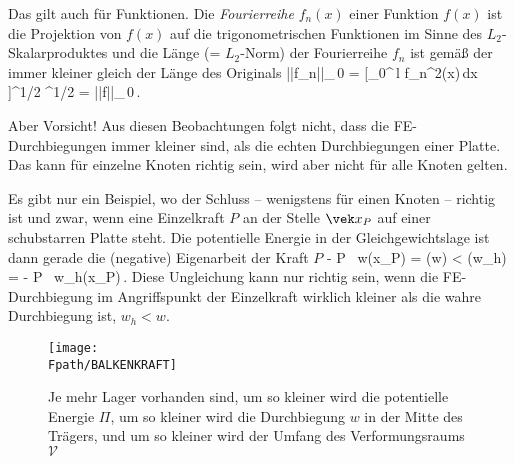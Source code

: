 Das gilt auch f\"{u}r Funktionen. Die {\em Fourierreihe\/} $f_n(x)$ einer Funktion $f(x)$ ist die Projektion
von $f(x)$ auf die trigonometrischen Funktionen im Sinne des $L_2$-Skalarproduktes und
die L\"{a}nge (= $L_2$-Norm) der Fourierreihe $f_n$ ist gem\"{a}{\ss} der  immer kleiner gleich der L\"{a}nge des Originals
\bfoo
||f_n||_{\,0} = [\int_0^{\,l} f_n^2(x)\,dx ]^{1/2} \leq [\int_0^{\,l} f^2(x)\,dx ]^{1/2}
= ||f||_{\,0}\,.
\efoo

Aber Vorsicht! Aus diesen Beobachtungen folgt nicht, dass die FE-Durchbie\-gung\-en immer
kleiner sind, als die echten Durchbiegungen einer Platte. Das kann f\"{u}r einzelne Knoten
richtig sein, wird aber nicht f\"{u}r alle Knoten gelten.

Es gibt nur ein Beispiel, wo der Schluss -- wenigstens f\"{u}r einen Knoten -- richtig ist
und zwar, wenn eine Einzelkraft $P$ an der Stelle $\vek x_P$ auf einer schubstarren
Platte steht. Die potentielle Energie in der Gleichgewichtslage ist dann gerade die
(negative) Eigenarbeit der Kraft $P$
\bfoo
 - P \, w(\vek x_P) = \Pi(w) < \Pi(w_{h}) = - P \, w_{h}(\vek x_P)\,.
\efoo
Diese Ungleichung kann nur richtig sein, wenn die FE-Durchbiegung im Angriffspunkt der
Einzelkraft wirklich kleiner als die wahre Durchbiegung ist, $ w_{h} < w $.
\begin{figure}[tbp]
\if {} \sidecaption \fi
\texttt{[image: \\Fpath/BALKENKRAFT]}
\caption{Je mehr Lager vorhanden sind, um so kleiner wird die potentielle Energie $\Pi$,
um so kleiner wird die Durchbiegung $w$ in der Mitte des Tr\"{a}gers, und um so kleiner wird
der Umfang des Verformungsraums $\mathcal{V}$} \label{BalkenKraft}
\end{figure}%

